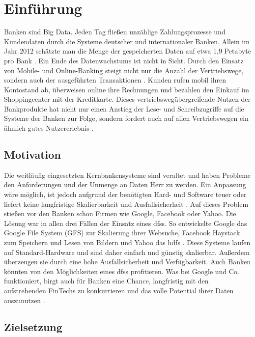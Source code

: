 \documentclass[12pt,oneside,a4paper,parskip]{scrbook}
\begin{document}
\mainmatter

\chapter{Einführung}\label{ch:intro}
Banken sind Big Data. Jeden Tag fließen unzählige Zahlungsprozesse und Kundendaten durch die Systeme deutscher und internationaler Banken. Allein im Jahr 2012 schätzte man die Menge der gespeicherten Daten auf etwa 1,9 Petabyte pro Bank \cite{datanami}. Ein Ende des Datenwachstums ist nicht in Sicht. Durch den Einsatz von Mobile- und Online-Banking steigt nicht nur die Anzahl der Vertriebswege, sondern auch der ausgeführten Transaktionen \cite{DBBigData}. Kunden rufen mobil ihren Kontostand ab, überweisen online ihre Rechnungen und bezahlen den Einkauf im Shoppingcenter mit der Kreditkarte. Dieses vertriebswegübergreifende Nutzen der Bankprodukte hat nicht nur einen Anstieg der Lese- und Schreibzugriffe auf die Systeme der Banken zur Folge, sondern fordert auch auf allen Vertriebswegen ein ähnlich gutes Nutzererlebnis \cite{bankwirtschaft}.

\section{Motivation}
Die weitläufig eingesetzten Kernbankensysteme sind veraltet und haben Probleme den Anforderungen und der Unmenge an Daten Herr zu werden. Ein Anpassung wäre möglich, ist jedoch aufgrund der benötigten Hard- und Software teuer oder liefert keine langfristige Skalierbarkeit und Ausfallsicherheit \cite{herzKernbankensystem}. Auf dieses Problem stießen vor den Banken schon Firmen wie Google, Facebook oder Yahoo. Die Lösung war in allen drei Fällen der Einsatz eines \acp{dfs}. So entwickelte Google das Google File System (GFS)\cite{GFS} zur Skalierung ihrer Websuche, Facebook Haystack \cite{haystack} zum Speichern und Lesen von Bildern und Yahoo das \ac{hdfs} \cite{hdfs}. Diese Systeme laufen auf Standard-Hardware und sind daher einfach und günstig skalierbar. Außerdem überzeugen sie durch eine hohe Ausfallsicherheit und Verfügbarkeit. Auch Banken könnten von den Möglichkeiten eines \acp{dfs} profitieren. Was bei Google und Co. funktioniert, birgt auch für Banken eine Chance, langfristig mit den aufstrebenden FinTechs zu konkurrieren und das volle Potential ihrer Daten auszunutzen \cite{wiki:fintech}.

\section{Zielsetzung}
\end{document}
